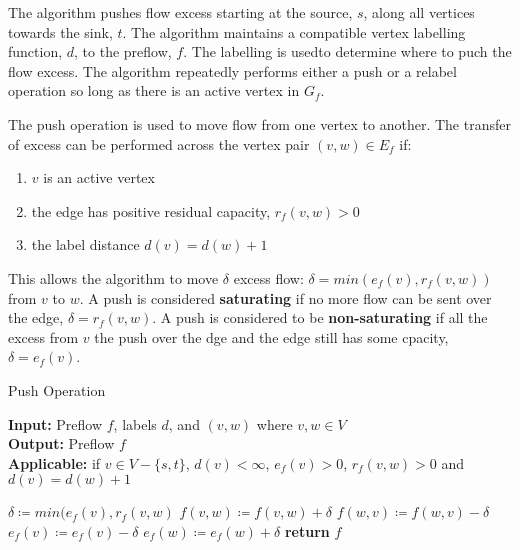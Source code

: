 The algorithm pushes flow excess starting at the source, $s$, along all vertices towards the sink, $t$. The algorithm maintains a compatible vertex labelling function, $d$, to the preflow, $f$. The labelling is usedto determine where to puch the flow excess. The algorithm repeatedly performs either a push or a relabel operation so long as there is an active vertex in $G_f$.

\begin{definition}
	The push operation is used to move flow from one vertex to another. The transfer of excess can be performed across the vertex pair $(v,w) \in E_f$ if:
	\begin{enumerate}
		\item $v$ is an active vertex
		\item the edge has positive residual capacity, $r_f(v,w)>0$
		\item the label distance $d(v) = d(w)+1$
	\end{enumerate}
\end{definition}
This allows the algorithm to move $\delta$ excess flow: $\delta = min (e_f(v), r_f(v,w))$ from $v$ to $w$. A push is considered \textbf{saturating} if no more flow can be sent over the edge, $\delta = r_f(v,w)$. A push is considered to be \textbf{non-saturating} if all the excess from $v$ the push over the dge and the edge still has some cpacity, $\delta = e_f(v)$.

\begin{algorithm}
	\caption{Push Operation}\label{alg:push}
	\textbf{Input:} Preflow $f$, labels $d$, and $(v,w)$ where $v,w \in V$\\
	\textbf{Output:} Preflow $f$\\
	\textbf{Applicable:} if $v \in V-\{s,t\}$, $d(v) < \infty$, $e_f(v)>0$, $r_f(v,w)>0$ and $d(v)=d(w)+1$
	\begin{algorithmic}[1]
		\State $\delta \coloneqq min(e_f(v), r_f(v,w)$
		\State $f(v,w) \coloneqq f(v,w) + \delta$
		\State $f(w,v) \coloneqq f(w,v) - \delta$
		\State $e_f(v) \coloneqq e_f(v) - \delta$
		\State $e_f(w) \coloneqq e_f(w) + \delta$
		\State \textbf{return} $f$
		\EndProcedure
	\end{algorithmic}
\end{algorithm}
	
